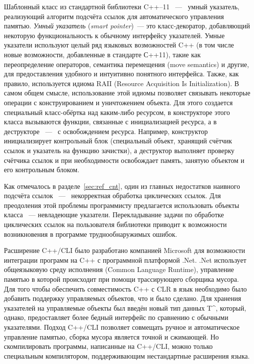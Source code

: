 Шаблонный класс  из стандартной библиотеки C++--11
~---~ умный указатель, реализующий алгоритм подсчёта ссылок для автоматического управления 
памятью. 
\emph{Умный указатель} (\emph{smart pointer})~--- это класс-декоратор, добавляющий некоторую 
функциональность к обычному интерфейсу указателей. Умные указатели используют целый ряд 
языковых возможностей C++ (в том числе новые возможности, добавленные в стандарте С++11), 
такие как переопределение операторов, семантика перемещения (move semantics) и другие, 
для предоставления удобного и интуитивно понятного интерфейса. 
Также, как правило, используется идиома RAII (Resource Acquisition Is Initialization). 
В самом общем смысле, использование этой идиомы позволяет связывать некоторые операции с 
конструированием и уничтожением объекта. 
Для этого создается специальный класс-обёртка над каким-либо ресурсом, в конструкторе этого 
класса вызываются функции, связанные с инициализацией ресурса, а в деструкторе ~---~ с 
освобождением ресурса. 
Например, конструктор  инициализирует контрольный блок (специальный 
объект, хранящий счётчик ссылок и указатель на функцию зачистки), а деструктор выполняет 
проверку счётчика ссылок и при необходимости освобождает память, занятую объектом и его 
контрольным блоком.

Как отмечалось в разделе~\ref{sec:ref_cnt}, один из главных недостатков наивного подсчёта 
ссылок ~---~ некорректная обработка циклических ссылок. 
Для преодоления этой проблемы программисту предлагается использовать объекты класса 
~--- невладеющие указатели. 
Перекладывание задачи по обработке циклических ссылок на пользователя библиотеки приводит 
к возможности возникновения в программе труднообнаружимых ошибок.

Расширение C++/CLI было разработано компанией Microsoft для возможности интеграции программ 
на C++ с программной платформой .Net. .Net использует общеязыковую среду исполнения 
(Common Language Runtime), управление памятью в которой происходит при помощи трассирующего 
сборщика мусора. 
Для того чтобы обеспечить совместимость C++ с CLR в язык необходимо было добавить поддержку 
управляемых объектов, что и было сделано. 
Для хранения указателей на управляемые объекты был введён новый тип данных 
T\textasciicircum, который, однако, предоставляет более бедный интерфейс по сравнению с 
обычными указателями. 
Подход C++/CLI позволяет совмещать ручное и автоматическое управление памятью, сборка 
мусора является точной и сжимающей. Но скомпилировать программы, написанные на C++/CLI, 
можно только специальным компилятором, поддерживающим нестандартные расширения языка.


